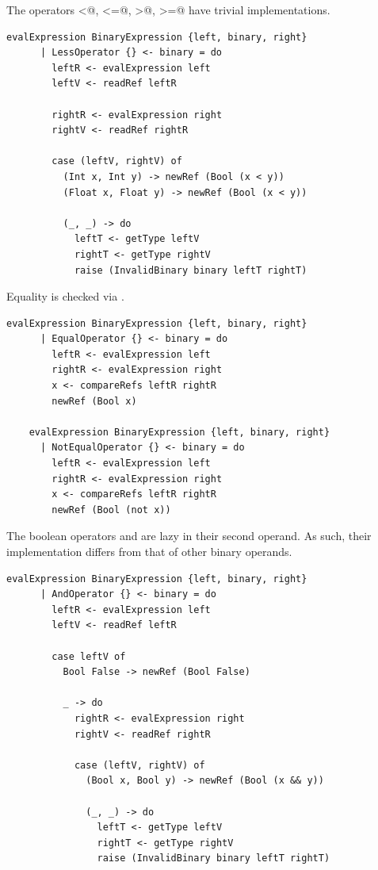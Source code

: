 \documentclass[UdineBachThesis,american,11pt]{PhdThesis}
\begin{document}
  The operators \lstinline@<@, \lstinline@<=@, \lstinline@>@, \lstinline@>=@
  have trivial implementations.

  \begin{lstlisting}[gobble=4,basicstyle=\ttfamily\small]
    evalExpression BinaryExpression {left, binary, right}
      | LessOperator {} <- binary = do
        leftR <- evalExpression left
        leftV <- readRef leftR

        rightR <- evalExpression right
        rightV <- readRef rightR

        case (leftV, rightV) of
          (Int x, Int y) -> newRef (Bool (x < y))
          (Float x, Float y) -> newRef (Bool (x < y))

          (_, _) -> do
            leftT <- getType leftV
            rightT <- getType rightV
            raise (InvalidBinary binary leftT rightT)
  \end{lstlisting}

  Equality is checked via \lstinline@compareRefs@.

  \begin{lstlisting}[gobble=4,basicstyle=\ttfamily\small]
    evalExpression BinaryExpression {left, binary, right}
      | EqualOperator {} <- binary = do
        leftR <- evalExpression left
        rightR <- evalExpression right
        x <- compareRefs leftR rightR
        newRef (Bool x)

    evalExpression BinaryExpression {left, binary, right}
      | NotEqualOperator {} <- binary = do
        leftR <- evalExpression left
        rightR <- evalExpression right
        x <- compareRefs leftR rightR
        newRef (Bool (not x))
  \end{lstlisting}

  The boolean operators \lstinline@and@ and \lstinline@or@ are lazy in their
  second operand. As such, their implementation differs from that of other
  binary operands.

  \begin{lstlisting}[gobble=4,basicstyle=\ttfamily\small]
    evalExpression BinaryExpression {left, binary, right}
      | AndOperator {} <- binary = do
        leftR <- evalExpression left
        leftV <- readRef leftR

        case leftV of
          Bool False -> newRef (Bool False)

          _ -> do
            rightR <- evalExpression right
            rightV <- readRef rightR

            case (leftV, rightV) of
              (Bool x, Bool y) -> newRef (Bool (x && y))

              (_, _) -> do
                leftT <- getType leftV
                rightT <- getType rightV
                raise (InvalidBinary binary leftT rightT)
  \end{lstlisting}
\end{document}
